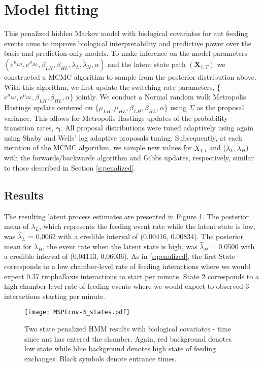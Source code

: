 \documentclass[smallextended]{svjour3}       %
\begin{document}
\section{Model fitting}
This penalized hidden Markov model with biological covariates for ant feeding events aims to improve biological interpretability and predictive power over the basic and prediction-only models. To make inference on the model parameters $(e^{\mu_{LH}}, e^{\mu_{HL}}, \beta_{LH}, \beta_{HL}, \lambda_L, \tilde{\lambda}_H, \alpha)$ and the latent state path $(\mathbf{X}_{1:T})$ we constructed a MCMC algorithm to sample from the posterior distribution above. With this algorithm, we first update the switching rate parameters, \{$e^{\mu_{LH}}, e^{\mu_{HL}}, \beta_{LH}, \beta_{HL}, \alpha$\} jointly. We conduct a Normal random walk Metropolis Hastings update centered on \{$\mu_{LH}, \mu_{HL}, \beta_{LH}, \beta_{HL}, \alpha$\} using $\Sigma$ as the proposal variance. This allows for Metropolis-Hastings updates of the probability transition rates, $\bm{\gamma}$. All proposal distributions were tuned adaptively using again using Shaby and Wells' log adaptive proposals tuning. Subsequently, at each iteration of the MCMC algorithm, we sample new values for $X_{1:t}$ and ($\lambda_L, \tilde{\lambda}_H$) with the forwards/backwards algorithm and Gibbs updates, respectively, similar to those described in Section \ref{s:penalized}. 
\subsection{Results}
The resulting latent process estimates are presented in Figure \ref{f:covstates}. The posterior mean of $\lambda_L$, which represents the feeding event rate while the latent state is low, was $\hat{\lambda}_L$ = 0.0062 with a credible interval of (0.00416, 0.00834). The posterior mean for $\lambda_H$, the event rate when the latent state is high, was $\hat{\lambda}_H$ = 0.0500 with a credible interval of (0.04113, 0.06036). As in \ref{s:penalized}, the first State corresponds to a low chamber-level rate of feeding interactions where we would expect 0.37 trophallaxis interactions to start per minute. State 2 corresponds to a high chamber-level rate of feeding events where we would expect to observed 3 interactions starting per minute. 
% 
\begin{figure}
 \centerline{\texttt{[image: MSPEcov-3\_states.pdf]}}
 \caption{Two state penalized HMM results with biological covariates - time since ant has entered the chamber. Again, red background denotes low state while blue background denotes high state of feeding exchanges. Black symbols denote entrance times.}
\label{f:covstates}
\end{figure}
% 
\end{document}
